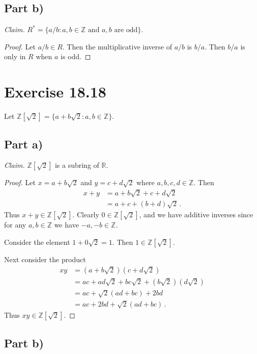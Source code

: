 \documentclass{abrice}
\newcommand{\Z}{\mathbb{Z}}
\newcommand{\R}{\mathbb{R}}
\begin{document}
\subsection{Part b)}

\emph{Claim.} $R^* = \{ a/b : a,b \in \Z \text{ and } a,b \text{ are odd} \}$.

\begin{proof}
  Let $a/b \in R$. Then the multiplicative inverse of $a/b$ is $b/a$. Then $b/a$
  is only in $R$ when $a$ is odd.
\end{proof}

\section{Exercise 18.18}

Let $\Z[\sqrt 2] = \{a + b\sqrt 2 : a,b \in \Z \}$.

\subsection{Part a)}

\emph{Claim.} $\Z[\sqrt 2]$ is a subring of $\R$.

\begin{proof}
  Let $x = a + b\sqrt 2$ and $y = c + d\sqrt{2}$ where $a,b,c,d \in \Z$. Then
  \begin{align*}
    x + y
    &= a + b\sqrt 2 + c + d\sqrt 2 \\
    &= a + c + (b + d)\sqrt 2\, .
  \end{align*}
  Thus $x + y \in \Z[\sqrt 2]$. Clearly $0 \in \Z[\sqrt 2]$, and we have
  additive inverses since for any $a,b \in \Z$ we have $-a, -b \in \Z$.

  Consider the element $1 + 0 \sqrt 2 = 1$. Then $1 \in \Z[\sqrt 2]$.

  Next consider the product
  \begin{align*}
    xy
    &= (a + b\sqrt 2) (c + d \sqrt 2) \\
    &= a c + a d \sqrt 2 + b c \sqrt 2 + (b \sqrt 2)(d \sqrt 2) \\
    &= a c + \sqrt 2 (ad + bc) + 2bd \\
    & = ac + 2bd + \sqrt 2(ad + bc)\, .
  \end{align*}
  Thus $xy \in \Z[\sqrt 2]$.
\end{proof}

\subsection{Part b)}
\end{document}
